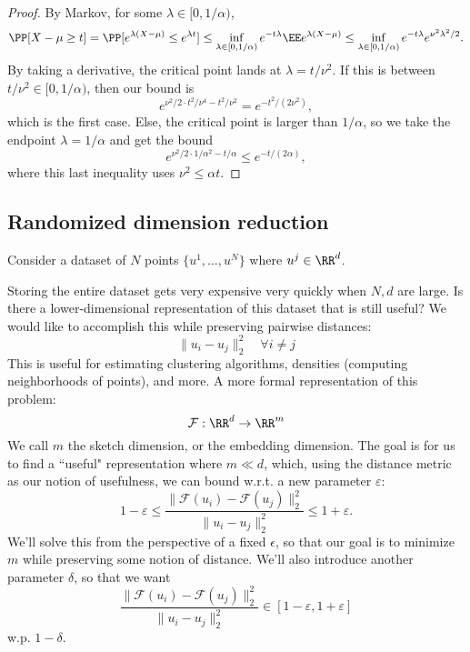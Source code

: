 \begin{proof}
	By Markov, for some $\lambda\in [0, 1/\alpha)$, 
\[\PP[X-\mu\geq t]= \PP[e^{\lambda(X-\mu)}\leq e^{\lambda t}]\leq \inf_{\lambda\in [0,1/\alpha)} e^{-t\lambda}\EE e^{\lambda(X-\mu)}\leq \inf_{\lambda\in [0, 1/\alpha)} e^{-t\lambda}e^{\nu^2\lambda^2/2}.\] 
By taking a derivative, the critical point lands at $\lambda = t/\nu^2$. If this is between $t/\nu^2\in [0,1/\alpha)$, then our bound is
\[e^{\nu^2/2\cdot t^2/\nu^4 - t^2 / \nu^2} = e^{-t^2/(2\nu^2)},\] 
which is the first case. Else, the critical point is larger than $1/\alpha$, so we take the endpoint $\lambda = 1/\alpha$ and get the bound 
\[e^{\nu^2/2\cdot 1/\alpha^2 - t/\alpha} \leq e^{-t/(2\alpha)},\] 
where this last inequality uses $\nu^2\leq \alpha t$. 
\end{proof}

\subsection{Randomized dimension reduction}

\begin{example}
\exlabel

Consider a dataset of $N$ points $\{u^1, \hdots, u^N\}$ where $u^j\in \RR^{d}$. 
\end{example}

Storing the entire dataset gets very expensive very quickly when $N,d$ are large. Is there a lower-dimensional representation of this dataset that is still useful? We would like to accomplish this while preserving pairwise distances:
\[\lVert u_i - u_j\rVert_2^2\quad \forall i\neq j\] 
This is useful for estimating clustering algorithms, densities (computing neighborhoods of points), and more. A more formal representation of this problem: 
\[\mathcal{F} : \RR^d\rightarrow \RR^m\] 
We call $m$ the \ac{sketch dimension}, or the \ac{embedding dimension}. The goal is for us to find a ``useful" representation where $m \ll d$, which, using the distance metric as our notion of usefulness, we can bound w.r.t. a new parameter $\varepsilon$:  
\[1 - \varepsilon \leq \frac{\lVert \mathcal{F}(u_i) - \mathcal{F}(u_j)\rVert_2^2}{\lVert u_i - u_j\rVert_2^2} \leq 1 + \varepsilon.\]
We'll solve this from the perspective of a fixed $\epsilon$, so that our goal is to minimize $m$ while preserving some notion of distance. We'll also introduce another parameter $\delta$, so that we want 
\[\frac{\lVert \mathcal{F}(u_i) - \mathcal{F}(u_j)\rVert_2^2}{\lVert u_i - u_j\rVert_2^2}\in [1-\varepsilon, 1+\varepsilon]\] 
w.p. $1-\delta$.


